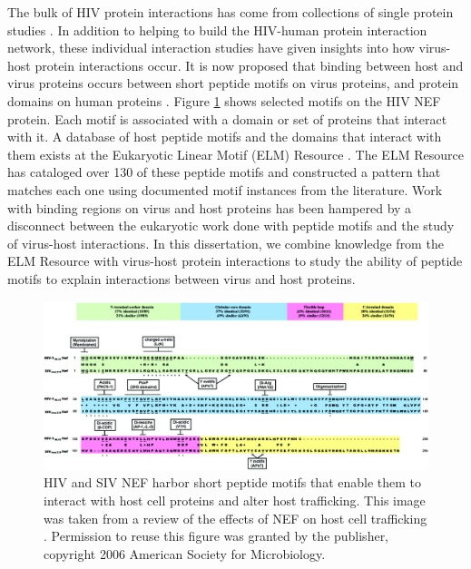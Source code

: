 The bulk of HIV protein interactions has come from collections of
single protein studies \cite{mendez2010global, chatr08, ptak08,
  driscoll2009pig}. In addition to helping to build the HIV-human
protein interaction network, these individual interaction studies have
given insights into how virus-host protein interactions occur. It is
now proposed that binding between host and virus proteins occurs
between short peptide motifs on virus proteins, and protein domains on
human proteins \cite{tonikian08,shelton08,kadaveru08}. Figure
\ref{fig:intro:nef} shows selected motifs on the HIV NEF protein. Each
motif is associated with a domain or set of proteins that interact
with it. A database of host peptide motifs and the domains that
interact with them exists at the Eukaryotic Linear Motif (ELM)
Resource \cite{puntervoll03}. The ELM Resource has cataloged over 130
of these peptide motifs and constructed a pattern that matches each
one using documented motif instances from the literature. Work with
binding regions on virus and host proteins has been hampered by a
disconnect between the eukaryotic work done with peptide motifs and
the study of virus-host interactions. In this dissertation, we combine
knowledge from the ELM Resource with virus-host protein interactions
to study the ability of peptide motifs to explain interactions between
virus and host proteins.

\begin{figure}
\begin{center}
\includegraphics[scale=0.25]{figs/intro_nef}
\end{center}
\caption[Host peptide motifs on HIV NEF]{\small HIV and SIV NEF harbor
  short peptide motifs that enable them to interact with host cell
  proteins and alter host trafficking. This image was taken from a
  review of the effects of NEF on host cell trafficking
  \cite{roeth06}. Permission to reuse this figure was granted by the
  publisher, copyright 2006 American Society for
  Microbiology. \label{fig:intro:nef}}
\end{figure}

